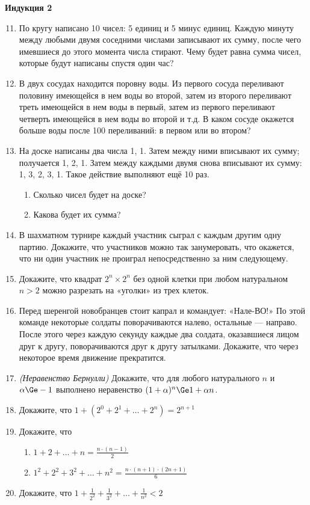 \centerline{\bf \large Индукция 2}
\begin{enumerate}
\setcounter{enumi}{10}
\item По кругу написано 10 чисел: 5 единиц и 5 минус единиц. Каждую минуту между любыми двумя соседними
числами записывают их сумму, после чего имевшиеся до этого момента числа стирают. Чему будет равна
сумма чисел, которые будут написаны спустя один час?
\item В двух сосудах находится поровну воды. Из первого сосуда переливают половину имеющейся в нем
воды во второй, затем из второго переливают треть имеющейся в нем воды в первый, затем из первого
переливают четверть имеющейся в нем воды во второй и т.д. В каком сосуде окажется больше воды после
100 переливаний: в первом или во втором?
\item На доске написаны два числа 1, 1. Затем между ними вписывают их сумму; получается 1, 2, 1.
Затем между каждыми двумя снова вписывают их сумму: 1, 3, 2, 3, 1. Такое действие выполняют ещё 10
раз.
\begin{enumerate}
\item Сколько чисел будет на доске?
\item Какова будет их сумма?
\end{enumerate}
\item В шахматном турнире каждый участник сыграл с каждым другим одну партию. Докажите, что
участников можно так занумеровать, что окажется, что ни один участник не проиграл непосредственно за
ним следующему.
\item Докажите, что квадрат $2^n \times 2^n$  без одной клетки при любом натуральном $n > 2$ можно разрезать
на «уголки» из трех клеток.
\item Перед шеренгой новобранцев стоит капрал и командует: «Нале-ВО!» По этой команде некоторые
солдаты поворачиваются налево, остальные — направо. После этого через каждую секунду каждые два
солдата, оказавшиеся лицом друг к другу, поворачиваются друг к другу затылками. Докажите, что через
некоторое время движение прекратится.
\item {\it (Неравенство Бернулли)} Докажите, что для любого натурального $n$ и $\alpha \Ge -1$ выполнено
неравенство $(1 + \alpha)^n \Ge 1 + \alpha n$.
\item Докажите, что $1 + (2^0 + 2^1 + \ldots + 2^n) = 2^{n + 1}$
\item Докажите, что
\begin{enumerate}
\item {\Large $1 + 2 + \ldots + n = \frac{n\cdot (n - 1)}{2}$}
\item {\Large $1^2 + 2^2 + 3^2 + \ldots + n^2 = \frac{n \cdot (n + 1) \cdot (2 n + 1)}{6}$}
\end{enumerate}
\item Докажите, что $1 + \frac{1}{2^2} + \frac{1}{3^2} + \ldots + \frac{1}{n^2} < 2$
\end{enumerate}
